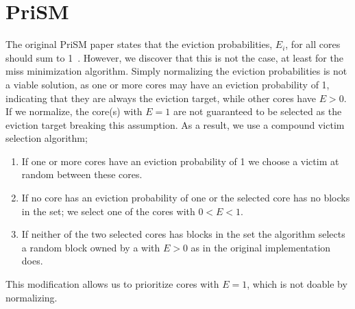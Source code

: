 \section{PriSM}

The original PriSM paper states that the eviction probabilities, $E_i$, for all cores should sum to 1~\cite{Manikantan2012}.
However, we discover that this is not the case, at least for the miss minimization algorithm.
Simply normalizing the eviction probabilities is not a viable solution, as one or more cores may have an eviction probability of 1, indicating that they are always the eviction target, while other cores have $E > 0$.
If we normalize, the core(s) with $E=1$ are not guaranteed to be selected as the eviction target breaking this assumption.
As a result, we use a compound victim selection algorithm;
\begin{enumerate}
\item If one or more cores have an eviction probability of 1 we choose a victim at random between these cores.
\item If no core has an eviction probability of one or the selected core has no blocks in the set; we select one of the cores with $0 < E < 1$.
\item If neither of the two selected cores has blocks in the set the algorithm selects a random block owned by a with $E > 0$ as in the original implementation does.
\end{enumerate}
This modification allows us to prioritize cores with $E = 1$, which is not doable by normalizing.